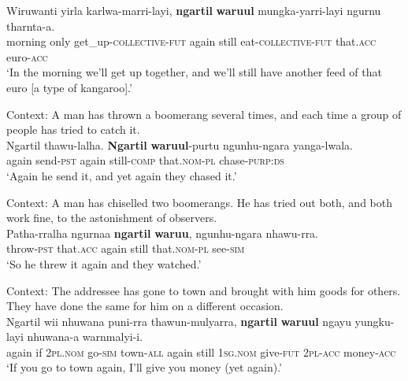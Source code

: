 \begin{exe}
	\ex\label{exAppendixMartuthuniraIterative1}
	\gll Wiruwanti yirla karlwa-marri-layi, \textbf{ngartil} \textbf{waruul} mungka-yarri-layi ngurnu tharnta-a.\\
	morning only get\_up-\textsc{collective}-\textsc{fut} again still eat-\textsc{collective}-\textsc{fut} that.\textsc{acc} euro-\textsc{acc}\\
	\glt \lq In the morning we'll get up together, and we'll still have another feed of that euro [a type of kangaroo].' \parencite[153]{Dench1994}

	\ex\label{exAppendixMartuthuniraIterative2}
	Context: A man has thrown a boomerang several times, and each time a group of people has tried to catch it.\\
	\gll Ngartil thawu-lalha. \textbf{Ngartil} \textbf{waruul}-purtu ngunhu-ngara yanga-lwala.\\
	again send-\textsc{pst} again still-\textsc{comp} that.\textsc{nom}-\textsc{pl} chase-\textsc{purp}:\textsc{ds}\\
	\glt \lq Again he send it, and yet again they chased it.\rq{ }\parencite[294–295]{Dench1994}

	\ex\label{exAppendixMartuthuniraIterative3}	
	Context: A man has chiselled two boomerangs. He has tried out both, and both work fine, to the astonishment of observers.\\
	\gll Patha-rralha ngurnaa \textbf{ngartil} \textbf{waruu}, ngunhu-ngara nhawu-rra.\\
	throw-\textsc{pst} that.\textsc{acc} again still that.\textsc{nom}-\textsc{pl} see-\textsc{sim}\\ 
	\glt \lq So he threw it again and they watched.' \parencite[292]{Dench1994}

	\ex\label{exAppendixMartuthuniraIterative4}
	Context: The addressee has gone to town and brought with him goods for others. They have done the same for him on a different occasion.\\
	\gll Ngartil wii nhuwana puni-rra thawun-mulyarra,  \textbf{ngartil} \textbf{waruul} ngayu yungku-layi nhuwana-a warnmalyi-i.\\
	again if 2\textsc{pl}.\textsc{nom} go-\textsc{sim} town-\textsc{all} again still 1\textsc{sg}.\textsc{nom} give-\textsc{fut} 2\textsc{pl}-\textsc{acc} money-\textsc{acc}\\
	\glt \lq If you go to town again, I'll give you money (yet again).\rq{ }\parencite[247, 275]{Dench1994}


\end{exe}
